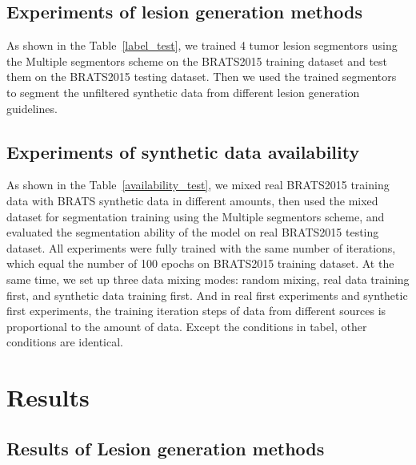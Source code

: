 \documentclass[letterpaper]{article} %
\begin{document}
\subsection{Experiments of lesion generation methods}
\label{label gen methods tests}
As shown in the Table~\ref{label_test}, we trained 4 tumor lesion segmentors using the Multiple segmentors scheme on the BRATS2015 training dataset and test them on the BRATS2015 testing dataset. Then we used the trained segmentors to segment the unfiltered synthetic data from different lesion generation guidelines.

\subsection{Experiments of synthetic data availability}
As shown in the Table~\ref{availability_test}, we mixed real BRATS2015 training data with BRATS synthetic data in different amounts, then used the mixed dataset for segmentation training using the Multiple segmentors scheme, and evaluated the segmentation ability of the model on real BRATS2015 testing dataset. All experiments were fully trained with the same number of iterations, which equal the number of 100 epochs on BRATS2015 training dataset. At the same time, we set up three data mixing modes: random mixing, real data training first, and synthetic data training first. And in real first experiments and synthetic first experiments, the training iteration steps of data from different sources is proportional to the amount of data. Except the conditions in tabel, other conditions are identical.

\section{Results}
\subsection{Results of Lesion generation methods}
\begin{table}[t]
	\caption{Lesion generation methods experiments}\smallskip
	\centering
	\label{label_test}	
\end{table}
\end{document}
